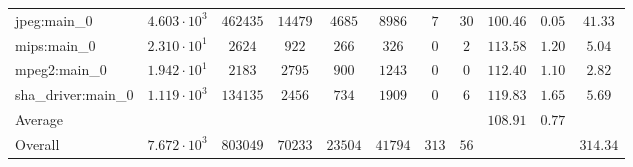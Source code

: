 \begin{tabular}{|l|c|c|c|c|c|c|c|c|c|c|}
jpeg:main\_0            & $ 4.603 \cdot 10^{3}  $ & $ 462435 $ & $ 14479 $ & $ 4685  $ & $ 8986  $ & $ 7   $ & $ 30 $ & $ 100.46      $ & $ 0.05    $ & $ 41.33   $ \\
mips:main\_0            & $ 2.310 \cdot 10^{1}  $ & $ 2624   $ & $ 922   $ & $ 266   $ & $ 326   $ & $ 0   $ & $ 2  $ & $ 113.58      $ & $ 1.20    $ & $ 5.04    $ \\
mpeg2:main\_0           & $ 1.942 \cdot 10^{1}  $ & $ 2183   $ & $ 2795  $ & $ 900   $ & $ 1243  $ & $ 0   $ & $ 0  $ & $ 112.40      $ & $ 1.10    $ & $ 2.82    $ \\
sha\_driver:main\_0     & $ 1.119 \cdot 10^{3}  $ & $ 134135 $ & $ 2456  $ & $ 734   $ & $ 1909  $ & $ 0   $ & $ 6  $ & $ 119.83      $ & $ 1.65    $ & $ 5.69    $ \\
\hline
Average                 & $                     $ & $        $ & $       $ & $       $ & $       $ & $     $ & $    $ & $ 108.91      $ & $ 0.77    $ & $         $ \\
\hline
Overall                 & $ 7.672 \cdot 10^{3}  $ & $ 803049 $ & $ 70233 $ & $ 23504 $ & $ 41794 $ & $ 313 $ & $ 56 $ & $             $ & $         $ & $ 314.34  $ \\
\hline
\end{tabular}
